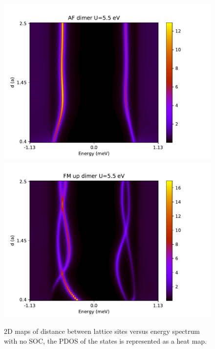 \documentclass[letterpaper,12pt]{article}
\begin{document}
\begin{figure}[h!]
    \includegraphics[scale = .5]{AF_dimer_U5_5.pdf}
    \includegraphics[scale = .5]{FM_dimer_U5_5.pdf}
    
    \caption{2D maps of distance between lattice sites versus energy spectrum with no SOC, the PDOS of the states is represented as a heat map.}
    \label{dimernoSOC}
\end{figure}
\end{document}
